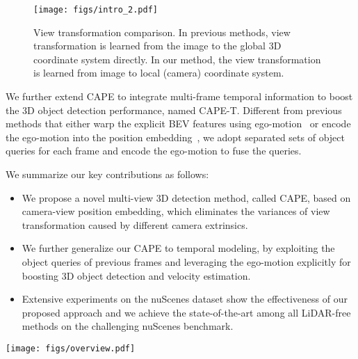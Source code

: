 \documentclass[10pt,twocolumn,letterpaper]{article}
\newcommand{\ourMethod}{CAPE}
\begin{document}
\begin{figure}[t]
\centering
\texttt{[image: figs/intro\_2.pdf]}
\caption{View transformation comparison. In previous methods, view transformation is learned from the image to the global 3D coordinate system directly. In our method, the view transformation is learned from image to local (camera) coordinate system.}
\centering
\label{fig:intro2}
\vspace{-10pt}
\end{figure}

We further extend \ourMethod{} to integrate multi-frame temporal information to boost the 3D object detection performance, named \ourMethod{}-T. Different from previous methods that either warp the explicit BEV features using ego-motion~\cite{li2022bevformer, 2022BEVDet4D} or encode the ego-motion into the position embedding~\cite{liu2022petrv2}, we adopt separated sets of object queries for each frame and encode the ego-motion to fuse the queries.


We summarize our key contributions as follows: 
\begin{itemize}
\vspace*{-1mm}
\item
We propose a novel multi-view 3D detection method, called \ourMethod{}, based on camera-view position embedding, which eliminates the variances of view transformation caused by different camera extrinsics.
\vspace*{-2mm}
\item
We further generalize our \ourMethod{} to temporal modeling, by exploiting the object queries of previous frames and leveraging the ego-motion explicitly for boosting 3D object detection and velocity estimation.

\vspace*{-2mm}
\item
Extensive experiments on the nuScenes dataset show the effectiveness of our proposed approach and we achieve the state-of-the-art among all LiDAR-free methods on the challenging nuScenes benchmark.
\vspace*{-1mm}
\end{itemize}


 
\begin{figure*}[t]
\centering
\texttt{[image: figs/overview.pdf]}
\caption{The overview of \ourMethod{}. The multi-view images are fed into the backbone network to extract the 2D features including  views. Key position embedding is formed by transforming camera-view frustum points to 3D coordinates in the camera system with camera intrinsics. Images features are used to guide the key position embedding in K-FPE; Query positional embedding is formed by converting the global 3D reference points into  camera-view coordinates with camera extrinsics. Then we encode them under the guidance of decoder embeddings in Q-FPE. The decoder embeddings are updated via the interaction with image features in the decoder. The updated decoder embeddings are used to predict 3D bounding boxes and object classes.}
\vspace{-10pt}
\centering
\label{fig:overview}
\end{figure*}
\end{document}
